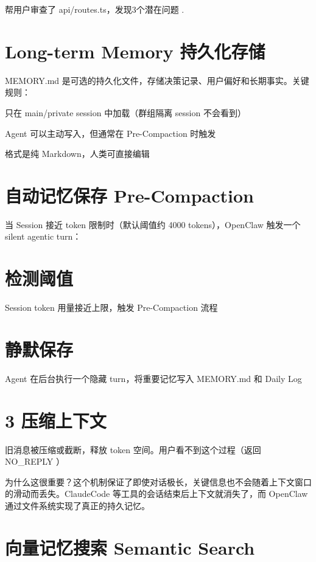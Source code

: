\documentclass[
  10
]{article}
\begin{document}
帮⽤户审查了 api/routes.ts，发现3个潜在问题 .

\section{Long-term Memory
持久化存储}\label{long-term-memory-ux6301ux4e45ux5316ux5b58ux50a8}

MEMORY.md
是可选的持久化文件，存储决策记录、用户偏好和长期事实。关键规则：

只在 main/private session 中加载（群组隔离 session 不会看到）

Agent 可以主动写入，但通常在 Pre-Compaction 时触发

格式是纯 Markdown，人类可直接编辑

\section{自动记忆保存
Pre-Compaction}\label{ux81eaux52a8ux8bb0ux5fc6ux4fddux5b58-pre-compaction}

当 Session 接近 token 限制时（默认阈值约 4000 tokens），OpenClaw
触发一个 silent agentic turn：

\section{检测阈值}\label{ux68c0ux6d4bux9608ux503c}

Session token 用量接近上限，触发 Pre-Compaction 流程

\section{静默保存}\label{ux9759ux9ed8ux4fddux5b58}

Agent 在后台执行一个隐藏 turn，将重要记忆写入 MEMORY.md 和 Daily Log

\section{3 压缩上下文}\label{ux538bux7f29ux4e0aux4e0bux6587}

旧消息被压缩或截断，释放 token 空间。用户看不到这个过程（返回 NO\_REPLY
）

为什么这很重要？这个机制保证了即使对话极长，关键信息也不会随着上下文窗口的滑动而丢失。ClaudeCode
等工具的会话结束后上下文就消失了，而 OpenClaw
通过文件系统实现了真正的持久记忆。

\section{向量记忆搜索 Semantic
Search}\label{ux5411ux91cfux8bb0ux5fc6ux641cux7d22-semantic-search}
\end{document}
